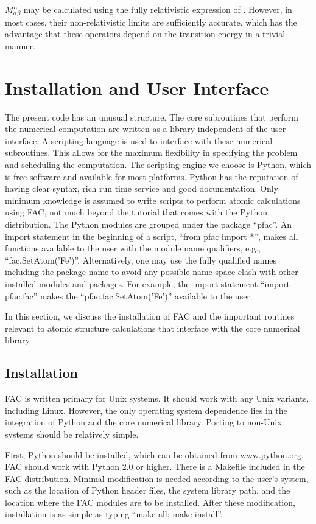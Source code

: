 \documentclass{elsart}
\begin{document}
$M^L_{\alpha\beta}$ may be calculated using the fully relativistic
expression of \citet{grant74}. However, in most cases, their non-relativistic
limits are sufficiently accurate, which has the advantage that these operators
depend on the transition energy in a trivial manner. 

\section{Installation and User Interface}
\label{sec_program}
The present code has an unusual structure. The core subroutines that
perform the numerical computation are written as a library independent of the
user interface. A scripting language is used to interface with these numerical
subroutines. This allows for the maximum flexibility in specifying the problem
and scheduling the computation. The scripting engine we choose is Python, 
which is free software and available for most
platforms. Python has the reputation of having clear syntax, rich run time
service and good documentation. Only minimum knowledge is assumed to write
scripts to perform atomic calculations using FAC, not much beyond the tutorial
that comes with the Python distribution. The Python modules are grouped under
the package ``pfac''. An import statement in the beginning of a script, 
``from pfac import *'', makes all functions available to the user with the
module name qualifiers, e.g., ``fac.SetAtom('Fe')''. Alternatively, one may
use the fully qualified names including the package name to avoid any possible
name space clash with other installed modules and packages. For example,
the import statement ``import pfac.fac'' makes the ``pfac.fac.SetAtom('Fe')''
available to the user. 

In this section, we discuss the
installation of FAC and the important routines relevant to atomic structure
calculations that interface with the core numerical library.

\subsection{Installation}
FAC is written primary for Unix systems. It should work with any Unix variants,
including Linux. However, the only operating system dependence lies in the
integration of Python and the core numerical library. Porting to 
non-Unix systems should be relatively simple. 

First, Python should be installed, which can be obtained from
www.python.org. FAC should work with Python 2.0 or higher. There is a Makefile
included in the FAC distribution. Minimal modification is needed according to
the user's system, such as the location of Python header files, the system
library path, and the location where the FAC modules are to be
installed. After these 
modification, installation is as simple as typing ``make all; make install''. 
\end{document}

